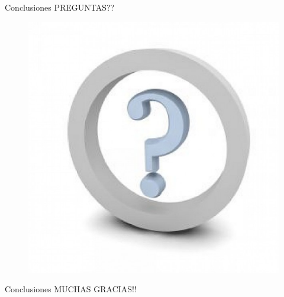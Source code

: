 \documentclass[xcolor=dvipsnames]{beamer}
\begin{document}
\begin{frame}{Conclusiones}
	\center
	\huge PREGUNTAS??
	\begin{figure}
\includegraphics[scale=0.3]{figures/pregunta.eps} 
\end{figure}
\end{frame}

\begin{frame}{Conclusiones}
	\center
	\huge MUCHAS GRACIAS!!
\end{frame}
\end{document}
